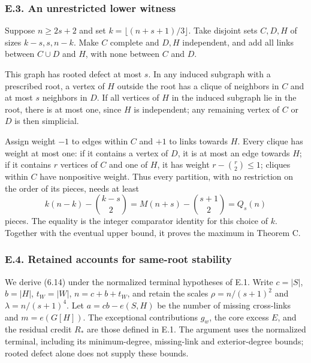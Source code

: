 \documentclass[english,11pt,a4paper]{article}
\newcounter{none}
\begin{document}
\subsubsection{E.3. An unrestricted lower witness}\label{e.3.-an-unrestricted-lower-witness}

Suppose \(n\ge2s+2\) and set \(k=\lfloor(n+s+1)/3\rfloor\). Take disjoint sets \(C,D,H\) of sizes \(k-s,s,n-k\). Make \(C\) complete and \(D,H\) independent, and add all links between \(C\cup D\) and \(H\), with none between \(C\) and \(D\).

This graph has rooted defect at most \(s\). In any induced subgraph with a prescribed root, a vertex of \(H\) outside the root has a clique of neighbors in \(C\) and at most \(s\) neighbors in \(D\). If all vertices of \(H\) in the induced subgraph lie in the root, there is at most one, since \(H\) is independent; any remaining vertex of \(C\) or \(D\) is then simplicial.

Assign weight \(-1\) to edges within \(C\) and \(+1\) to links towards \(H\). Every clique has weight at most one: if it contains a vertex of \(D\), it is at most an edge towards \(H\); if it contains \(r\) vertices of \(C\) and one of \(H\), it has weight \(r-\binom r2\le1\); cliques within \(C\) have nonpositive weight. Thus every partition, with no restriction on the order of its pieces, needs at least \[
k(n-k)-\binom{k-s}{2}
=M(n+s)-\binom{s+1}{2}=Q_s(n)
\tag{E.5}
\] pieces. The equality is the integer comparator identity for this choice of \(k\). Together with the eventual upper bound, it proves the maximum in Theorem C.

\subsubsection{E.4. Retained accounts for same-root stability}\label{e.4.-retained-accounts-for-same-root-stability}

We derive (6.14) under the normalized terminal hypotheses of E.1. Write \(c=|S|\), \(b=|H|\), \(t_W=|W|\), \(n=c+b+t_W\), and retain the scales \(\rho=n/(s+1)^2\) and \(\lambda=n/(s+1)^4\). Let \(a=cb-e(S,H)\) be the number of missing cross-links and \(m=e(G[H])\). The exceptional contributions \(g_w\), the core excess \(E\), and the residual credit \(R_*\) are those defined in E.1. The argument uses the normalized terminal, including its minimum-degree, missing-link and exterior-degree bounds; rooted defect alone does not supply these bounds.
\end{document}
